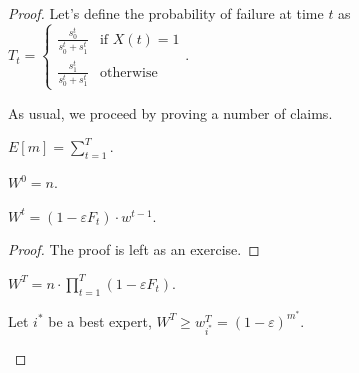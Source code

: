 \begin{proof}
    Let's define the probability of failure at time $t$ as $T_t =
    \begin{cases}
        \frac{s^t_0}{s^t_0 + s^t_1} &\text{if } X(t)=1\\
        \frac{s^t_1}{s^t_0 + s^t_1} &\text{otherwise}
    \end{cases}.$
    
    As usual, we proceed by proving a number of claims.
    
    \begin{claim}\label{cl:exp-rwm-1}
        $E[m] = \sum_{t=1}^{T}$.
    \end{claim}

    \begin{claim}\label{cl:exp-rwm-2}
        $W^0 = n$.
    \end{claim}

    \begin{claim}\label{cl:exp-rwm-3}
        $W^t = \left(1- \varepsilon F_t\right) \cdot w^{t-1}$.
    \end{claim}
    \begin{proof}
        The proof is left as an exercise.
    \end{proof}

    \begin{claim}\label{cl:exp-rwm-4}
        $W^T = n \cdot \prod_{t=1}^T \left( 1 - \varepsilon F_t \right)$.
    \end{claim}

    \begin{claim}\label{cl:exp-rwm-5}
        Let $i^*$ be a best expert, $W^T \geq w_{i^*}^T = \left( 1 - \varepsilon \right)^{m^*}$.
    \end{claim}


\end{proof}
